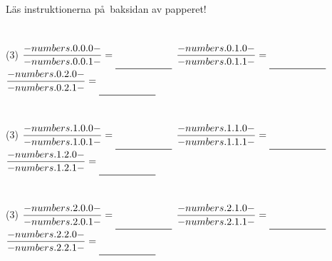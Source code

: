 \documentclass[12pt,sans]{article}
\newcommand{\ans}{\rule[-4mm]{2cm}{0.5pt}}
\begin{document}
\begin{center}
    L\"as instruktionerna p\aa\ baksidan av papperet!
\end{center}


\section{}
\begin{tasks}(3)
	\task \( \displaystyle \frac{ {{- numbers.0.0.0 -}} }{ {{- numbers.0.0.1 -}} } = \ans \)
	\task \( \displaystyle \frac{ {{- numbers.0.1.0 -}} }{ {{- numbers.0.1.1 -}} } = \ans \)
	\task \( \displaystyle \frac{ {{- numbers.0.2.0 -}} }{ {{- numbers.0.2.1 -}} } = \ans \)
\end{tasks}

\section{}
\begin{tasks}(3)
	\task \( \displaystyle \frac{ {{- numbers.1.0.0 -}} }{ {{- numbers.1.0.1 -}} } = \ans \)
	\task \( \displaystyle \frac{ {{- numbers.1.1.0 -}} }{ {{- numbers.1.1.1 -}} } = \ans \)
	\task \( \displaystyle \frac{ {{- numbers.1.2.0 -}} }{ {{- numbers.1.2.1 -}} } = \ans \)
\end{tasks}

\section{}
\begin{tasks}(3)
	\task \( \displaystyle \frac{ {{- numbers.2.0.0 -}} }{ {{- numbers.2.0.1 -}} } = \ans \)
	\task \( \displaystyle \frac{ {{- numbers.2.1.0 -}} }{ {{- numbers.2.1.1 -}} } = \ans \)
	\task \( \displaystyle \frac{ {{- numbers.2.2.0 -}} }{ {{- numbers.2.2.1 -}} } = \ans \)
\end{tasks}
\end{document}
